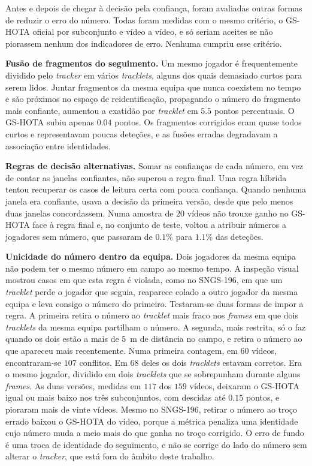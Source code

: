 Antes e depois de chegar à decisão pela confiança, foram avaliadas outras formas de reduzir o erro
do número. Todas foram medidas com o mesmo critério, o GS-HOTA oficial por subconjunto e vídeo a
vídeo, e só seriam aceites se não piorassem nenhum dos indicadores de erro. Nenhuma cumpriu esse
critério.

\medskip\noindent\textbf{Fusão de fragmentos do seguimento.} Um mesmo jogador é frequentemente dividido pelo
\emph{tracker} em vários \emph{tracklets}, alguns dos quais demasiado curtos para serem lidos.
Juntar fragmentos da mesma equipa que nunca coexistem no tempo e são próximos no espaço de
reidentificação, propagando o número do fragmento mais confiante, aumentou a exatidão por
\emph{tracklet} em $5.5$ pontos percentuais. O GS-HOTA subiu apenas $0.04$ pontos. Os fragmentos
corrigidos eram quase todos curtos e representavam poucas deteções, e as fusões erradas
degradavam a associação entre identidades.

\medskip\noindent\textbf{Regras de decisão alternativas.} Somar as confianças de cada número, em vez de contar
as janelas confiantes, não superou a regra final. Uma regra híbrida tentou recuperar os casos de leitura
certa com pouca confiança. Quando nenhuma janela era confiante, usava a decisão da primeira versão,
desde que pelo menos duas janelas concordassem. Numa amostra de
$20$ vídeos não trouxe ganho no GS-HOTA face à regra final e, no conjunto de teste, voltou a
atribuir números a jogadores sem número, que passaram de $0.1\%$ para $1.1\%$ das deteções.

\medskip\noindent\textbf{Unicidade do número dentro da equipa.} Dois jogadores da mesma equipa não podem ter o
mesmo número em campo ao mesmo tempo. A inspeção visual mostrou casos em que esta regra é violada,
como no SNGS-196, em que um \emph{tracklet} perde o jogador que seguia, reaparece colado a outro
jogador da mesma equipa e leva consigo o número do primeiro. Testaram-se duas formas de impor a
regra. A primeira retira o número ao \emph{tracklet} mais fraco nos \emph{frames} em que dois
\emph{tracklets} da mesma equipa partilham o número. A segunda, mais restrita, só o faz
quando os dois estão a mais de $5$~m de distância no campo, e retira o número ao que apareceu mais
recentemente. Numa primeira contagem, em $60$ vídeos, encontraram-se $107$ conflitos. Em $68$ deles os dois
\emph{tracklets} estavam corretos. Era o mesmo jogador, dividido em dois \emph{tracklets} que se
sobrepunham durante alguns \emph{frames}. As duas versões, medidas em $117$ dos $159$ vídeos, deixaram o GS-HOTA
igual ou mais baixo nos três subconjuntos, com descidas até $0.15$ pontos, e pioraram mais de vinte
vídeos. Mesmo no SNGS-196, retirar o número ao troço errado baixou o GS-HOTA do vídeo, porque a métrica penaliza uma identidade cujo número muda a meio
mais do que ganha no troço corrigido. O erro de fundo é uma troca de identidade do seguimento, e
não se corrige do lado do número sem alterar o \emph{tracker}, que está fora do âmbito deste
trabalho.

